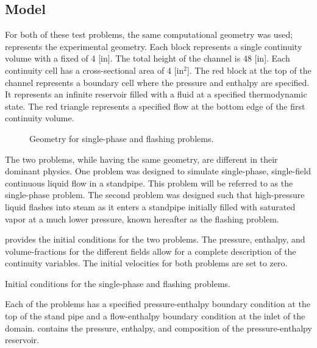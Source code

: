 \subsection{Model}
\label{subsect:single_model}
For both of these test problems, the same computational geometry was used;   represents the experimental geometry.
Each block represents a single continuity volume with a fixed \dx{} of 4 [in].
The total height of the channel is 48 [in].
Each continuity cell has a cross-sectional area of 4 [in$^2$].
The red block at the top of the channel represents a boundary cell where the pressure and enthalpy are specified.
It represents an infinite reservoir filled with a fluid at a specified thermodynamic state.
The red triangle represents a specified flow at the bottom edge of the first continuity volume. 

\begin{figure}[h!tb]
\centering

\caption{Geometry for single-phase and flashing problems.}
\label{fig:exp_geometry}
\end{figure}

The two problems, while having the same geometry, are different in their dominant physics.
One problem was designed to simulate single-phase, single-field continuous liquid flow in a standpipe.
This problem will be referred to as the single-phase problem.
The second problem was designed such that high-pressure liquid flashes into steam as it enters a standpipe initially filled with saturated vapor at a much lower pressure, known hereafter as the flashing problem.

 provides the initial conditions for the two problems.
The pressure, enthalpy, and volume-fractions for the different fields allow for a complete description of the continuity variables.
The initial velocities for both problems are set to zero.

\begin{table}[h!tb]
\centering
\singlespace

\caption{Initial conditions for the single-phase and flashing problems.}
\label{tab:dualInitialConditions}
\end{table}

Each of the problems has a specified pressure-enthalpy boundary condition at the top of the stand pipe and a flow-enthalpy boundary condition at the inlet of the domain.
 contains the pressure, enthalpy, and composition of the pressure-enthalpy reservoir. 

